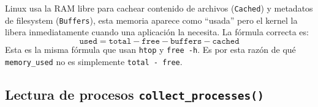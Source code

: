 \documentclass[12pt,letterpaper]{article}
\begin{document}
\medskip

Linux usa la RAM libre para cachear contenido de archivos (\texttt{Cached}) y metadatos de filesystem
(\texttt{Buffers}), esta memoria aparece como ``usada'' pero el kernel la libera inmediatamente cuando una
aplicación la necesita. La fórmula correcta es:
\[
\texttt{used} = \texttt{total} - \texttt{free} - \texttt{buffers} - \texttt{cached}
\]
Esta es la misma fórmula que usan \texttt{htop} y \texttt{free -h}. Es por esta razón de qué \texttt{memory\_used} no es simplemente \texttt{total - free}.

\subsection*{Lectura de procesos \texttt{collect\_processes()}}
\end{document}
